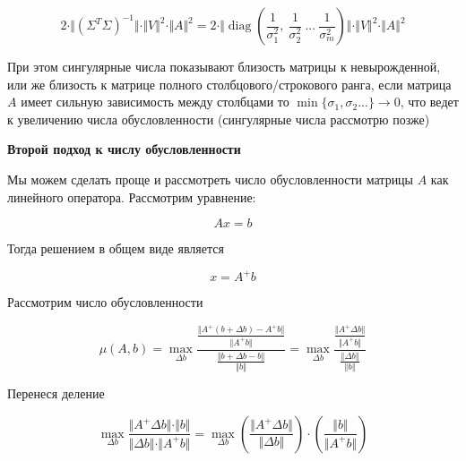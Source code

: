 \documentclass{article}
\begin{document}
    \begin{equation}
        2 \cdot \Vert (\Sigma^{T} \Sigma)^{-1} \Vert \cdot \Vert V \Vert^{2} \cdot \Vert A \Vert^{2} = 2 \cdot \Vert     \operatorname{diag}(\frac{1}{\sigma_{1}^{2} }, \ \frac{1}{\sigma_{2}^{2} } \ ... \ \frac{1}{\sigma_{m}^{2} })\Vert \cdot \Vert V \Vert^{2} \cdot \Vert A \Vert^{2}
    \end{equation}

    При этом сингулярные числа показывают близость матрицы к невырожденной, или же близость к матрице полного столбцового/строкового ранга,
    если матрица $A$ имеет сильную зависимость между столбцами то $\min\{\sigma_{1}, \sigma_{2} ... \} \rightarrow 0$, что ведет к увеличению числа обусловленности (сингулярные числа рассмотрю позже)

    \quad

    \textbf{Второй подход к числу обусловленности}

    \quad

    Мы можем сделать проще и рассмотреть число обусловленности матрицы $A$ как линейного оператора.
    Рассмотрим уравнение:

    \begin{equation}
        Ax = b
    \end{equation}

    Тогда решением в общем виде является

    \begin{equation}
        x = A^{+} b
    \end{equation}

    Рассмотрим число обусловленности

    \begin{equation}
        \mu(A, b) = \max_{\Delta b} \frac{ \frac{\Vert A^{+} (b + \Delta b) - A^{+} b \Vert}{ \Vert A^{+} b \Vert } }{ \frac{\Vert b + \Delta b - b \Vert}{\Vert b \Vert} } =
        \max_{\Delta b} \frac{ \frac{\Vert A^{+} \Delta b \Vert}{ \Vert A^{+} b \Vert } }{ \frac{\Vert \Delta b \Vert}{\Vert b \Vert} }
    \end{equation}

    Перенеся деление

    \begin{equation}
        \max_{\Delta b} \frac{ \Vert A^{+} \Delta b \Vert \cdot  \Vert b \Vert   }{ \Vert \Delta b \Vert \cdot  \Vert A^{+} b \Vert } =
        \max_{\Delta b} (\frac{\Vert A^{+} \Delta b \Vert}{\Vert \Delta b \Vert}) \cdot (\frac{\Vert b \Vert }{\Vert A^{+} b \Vert})
    \end{equation}
\end{document}
